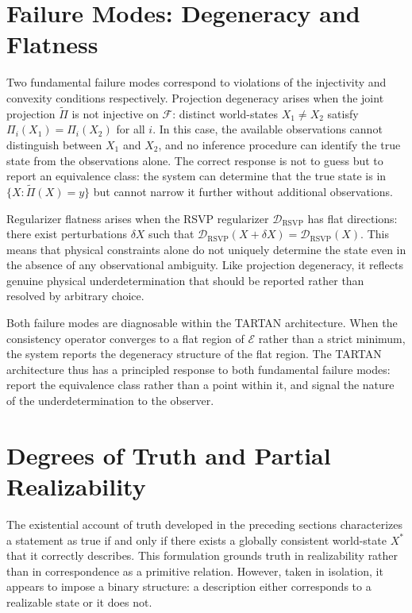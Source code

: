 \documentclass[11pt, oneside]{article}
\begin{document}
\section{Failure Modes: Degeneracy and Flatness}

Two fundamental failure modes correspond to violations of the injectivity and convexity conditions respectively. Projection degeneracy arises when the joint projection $\tilde{\Pi}$ is not injective on $\mathcal{F}$: distinct world-states $X_1 \neq X_2$ satisfy $\Pi_i(X_1) = \Pi_i(X_2)$ for all $i$. In this case, the available observations cannot distinguish between $X_1$ and $X_2$, and no inference procedure can identify the true state from the observations alone. The correct response is not to guess but to report an equivalence class: the system can determine that the true state is in $\{X : \tilde{\Pi}(X) = y\}$ but cannot narrow it further without additional observations.

Regularizer flatness arises when the RSVP regularizer $\mathcal{D}_{\mathrm{RSVP}}$ has flat directions: there exist perturbations $\delta X$ such that $\mathcal{D}_{\mathrm{RSVP}}(X + \delta X) = \mathcal{D}_{\mathrm{RSVP}}(X)$. This means that physical constraints alone do not uniquely determine the state even in the absence of any observational ambiguity. Like projection degeneracy, it reflects genuine physical underdetermination that should be reported rather than resolved by arbitrary choice.

Both failure modes are diagnosable within the TARTAN architecture. When the consistency operator converges to a flat region of $\mathcal{E}$ rather than a strict minimum, the system reports the degeneracy structure of the flat region. The TARTAN architecture thus has a principled response to both fundamental failure modes: report the equivalence class rather than a point within it, and signal the nature of the underdetermination to the observer.

\section{Degrees of Truth and Partial Realizability}

The existential account of truth developed in the preceding sections characterizes a statement as true if and only if there exists a globally consistent world-state $X^\ast$ that it correctly describes. This formulation grounds truth in realizability rather than in correspondence as a primitive relation. However, taken in isolation, it appears to impose a binary structure: a description either corresponds to a realizable state or it does not.
\end{document}
